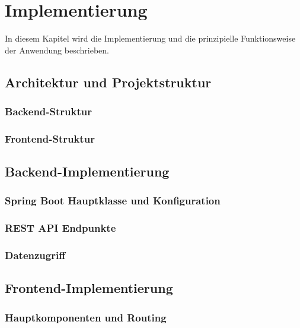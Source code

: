 \chapter{Implementierung}\label{Bausteine}

In diesem Kapitel wird die Implementierung und die prinzipielle Funktionsweise der Anwendung beschrieben.

\section{Architektur und Projektstruktur}\label{Architektur und Projektstruktur}

\subsection{Backend-Struktur}

\subsection{Frontend-Struktur}

\section{Backend-Implementierung}\label{Backend-Implementierung}

\subsection{Spring Boot Hauptklasse und Konfiguration}

\subsection{REST API Endpunkte}

\subsection{Datenzugriff}

\section{Frontend-Implementierung}\label{Frontend-Implementierung}

\subsection{Hauptkomponenten und Routing}

